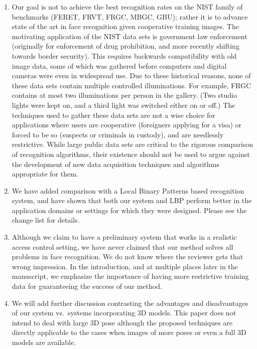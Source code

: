 \documentclass[11pt]{article}
\begin{document}
\begin{enumerate}
\item Our goal is not to achieve the best recognition rates on the NIST family of
benchmarks (FERET, FRVT, FRGC, MBGC, GBU); rather it is to advance state of
the art in face recognition given cooperative training images.  The motivating
application of the NIST data sets is government law enforcement (originally for
enforcement of drug prohibition, and more recently shifting towards border
security).  This requires backwards compatibility with old image data, some of
which was gathered before computers and digital cameras were even in widespread use.  
Due to these historical reasons, none of these data sets contain multiple controlled
illuminations.  For example, FRGC contains at most two illuminations per person
in the gallery.  (Two studio lights were kept on, and a third light was
switched either on or off.) The techniques used to gather these data sets are not a wise 
choice for applications where users are cooperative (foreigners applying for a visa)
or forced to be so (suspects or criminals in custody), and are needlessly
restrictive.  While large public data sets are critical to the rigorous
comparison of recognition algorithms, their existence should not be used to
argue against the development of new data acquisition techniques and algorithms
appropriate for them.

\item We have added comparison with a Local Binary Patterns based recognition system, and
have shown that both our system and LBP perform better in the application domains or settings
for which they were designed.  Please see the change list for details. 

\item Although we claim to have a preliminary system that works in a realistic
access control setting, we have never claimed that our method solves all problems in face
recognition. We do not know where the reviewer gets that wrong impression. 
In the introduction, and at multiple places later in the manuscript, we emphasize
the importance of having more restrictive training data for guaranteeing the success 
of our method. 


\item We will add further discussion contrasting the advantages and disadvantages of our
system vs.\ systems incorporating 3D models. This paper does not intend to deal with large 3D pose
although the proposed techniques are directly applicable to the cases when images of more poses or 
even a full 3D models are available. 


\end{enumerate}
\end{document}
